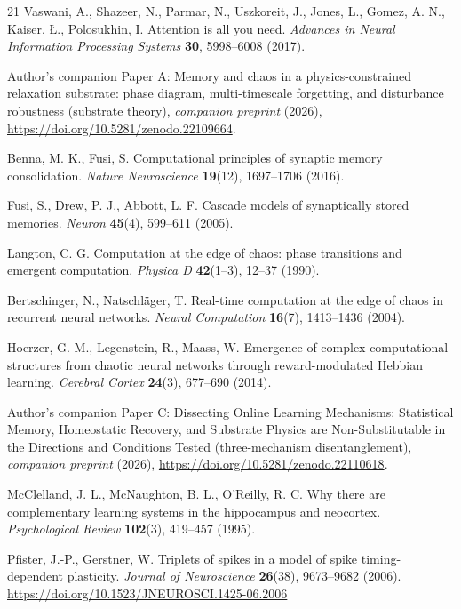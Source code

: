 \documentclass[11pt]{article}
\begin{document}
\begin{thebibliography}{21}
 Vaswani, A., Shazeer, N., Parmar, N., Uszkoreit, J.,
Jones, L., Gomez, A. N., Kaiser, {\L}., Polosukhin, I. Attention is all you
need. \emph{Advances in Neural Information Processing Systems} \textbf{30},
5998--6008 (2017).

 Author's companion Paper A: Memory and chaos in a
physics-constrained relaxation substrate: phase diagram, multi-timescale
forgetting, and disturbance robustness (substrate theory),
\emph{companion preprint} (2026),
\url{https://doi.org/10.5281/zenodo.22109664}.

 Benna, M. K., Fusi, S. Computational principles of synaptic
memory consolidation. \emph{Nature Neuroscience} \textbf{19}(12), 1697--1706
(2016).

 Fusi, S., Drew, P. J., Abbott, L. F. Cascade models of
synaptically stored memories. \emph{Neuron} \textbf{45}(4), 599--611 (2005).

 Langton, C. G. Computation at the edge of chaos: phase
transitions and emergent computation. \emph{Physica D} \textbf{42}(1--3),
12--37 (1990).

 Bertschinger, N., Natschläger, T. Real-time
computation at the edge of chaos in recurrent neural networks. \emph{Neural
Computation} \textbf{16}(7), 1413--1436 (2004).

 Hoerzer, G. M., Legenstein, R., Maass, W. Emergence of
complex computational structures from chaotic neural networks through
reward-modulated Hebbian learning. \emph{Cerebral Cortex} \textbf{24}(3),
677--690 (2014).

 Author's companion Paper C: Dissecting Online
Learning Mechanisms: Statistical Memory, Homeostatic Recovery, and
Substrate Physics are Non-Substitutable in the Directions and
Conditions Tested (three-mechanism disentanglement), \emph{companion
preprint} (2026),
\url{https://doi.org/10.5281/zenodo.22110618}.

 McClelland, J. L., McNaughton, B. L., O'Reilly, R. C.
Why there are complementary learning systems in the hippocampus and neocortex.
\emph{Psychological Review} \textbf{102}(3), 419--457 (1995).

 Pfister, J.-P., Gerstner, W. Triplets of spikes in a
model of spike timing-dependent plasticity. \emph{Journal of Neuroscience}
\textbf{26}(38), 9673--9682 (2006).
\url{https://doi.org/10.1523/JNEUROSCI.1425-06.2006}

\end{thebibliography}
\end{document}
